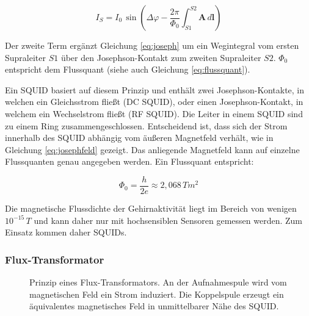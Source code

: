 \documentclass[doc,a4paper,12pt]{apa6}
\newcommand{\mx}[1]{\mathbf{#1}}
\begin{document}
\begin{equation}
\label{eq:josephfeld}
I_S = I_0\,\sin{\left( \Delta \varphi - \frac{2\pi}{\Phi_0} \int_{S1}^{S2} \mx{A}\,d\mx{l} \right)}
\end{equation}

Der zweite Term ergänzt Gleichung \ref{eq:joseph} um ein Wegintegral vom ersten Supraleiter $S1$ über den Josephson-Kontakt zum zweiten Supraleiter $S2$. $\Phi_0$ entspricht dem Flussquant (siehe auch Gleichung \ref{eq:flussquant}).

Ein SQUID basiert auf diesem Prinzip und enthält zwei Josephson-Kontakte, in welchen ein Gleichsstrom fließt (DC SQUID), oder einen Josephson-Kontakt, in welchem ein Wechselstrom fließt (RF SQUID). Die Leiter in einem SQUID sind zu einem Ring zusammengeschlossen. Entscheidend ist, dass sich der Strom innerhalb des SQUID abhängig vom äußeren Magnetfeld verhält, wie in Gleichung \ref{eq:josephfeld} gezeigt. Das anliegende Magnetfeld kann auf einzelne Flussquanten genau angegeben werden. Ein Flussquant entspricht:

\begin{equation}
\label{eq:flussquant}
\Phi_0 = \frac{h}{2e} \approx 2,068\,Tm^2
\end{equation}

Die magnetische Flussdichte der Gehirnaktivität liegt im Bereich von wenigen $10^{-15}\,T$ und kann daher nur mit hochsensiblen Sensoren gemessen werden. Zum Einsatz kommen daher SQUIDs.

\subsubsection{Flux-Transformator}

\begin{figure}[t]
  \centering
  \setlength{\fboxsep}{8mm}
  \vspace*{3mm}
  \caption[Prinzip eines Flux-Transformators]{Prinzip eines Flux-Transformators. An der Aufnahmespule wird vom magnetischen Feld ein Strom induziert. Die Koppelspule erzeugt ein äquivalentes magnetisches Feld in unmittelbarer Nähe des SQUID.}
  \label{img:flux-trafo}
\end{figure}
\end{document}
